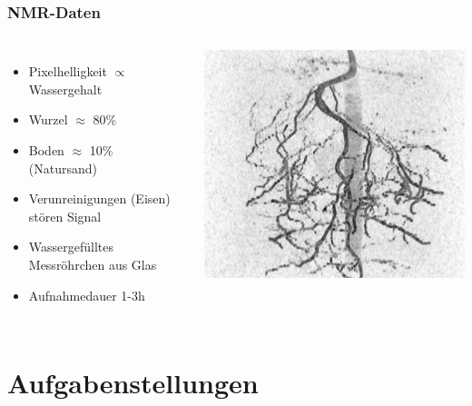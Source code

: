 \documentclass[final,ngerman,ignorenonframetext,compress]{beamer}
\begin{document}
\begin{frame}
	\frametitle{NMR-Daten}
	\begin{columns}
		\begin{itemize}
			\item Pixelhelligkeit $\propto$ Wassergehalt
			\item Wurzel $\approx$ 80\%
			\item Boden $\approx$ 10\%  (Natursand)
			\item Verunreinigungen (Eisen) st\"oren Signal
			\item Wassergef\"ulltes Messr\"ohrchen aus Glas
			\item Aufnahmedauer 1-3h
		\end{itemize}
		\includegraphics[width=\linewidth]{img/raw-4.png}
	\end{columns}
\end{frame}

\section{Aufgabenstellungen}
\end{document}
